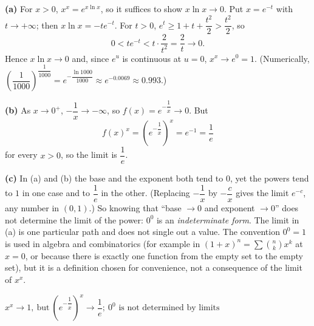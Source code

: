 \textbf{(a)} For $x>0$, $x^x=e^{x\ln x}$, so it suffices to show $x\ln x\to0$. Put $x=e^{-t}$ with $t\to+\infty$; then $x\ln x=-te^{-t}$. For $t>0$, $e^t\ge1+t+\dfrac{t^2}{2}>\dfrac{t^2}{2}$, so
\[0<te^{-t}<t\cdot\dfrac{2}{t^2}=\dfrac2t\to0.\]
Hence $x\ln x\to0$ and, since $e^u$ is continuous at $u=0$, $x^x\to e^0=1$. (Numerically, $\left(\dfrac{1}{1000}\right)^{\dfrac{1}{1000}}=e^{-\dfrac{\ln1000}{1000}}\approx e^{-0.0069}\approx0.993$.)

\textbf{(b)} As $x\to0^+$, $-\dfrac1x\to-\infty$, so $f(x)=e^{-\dfrac1x}\to0$. But
\[f(x)^x=\left(e^{-\dfrac1x}\right)^x=e^{-1}=\dfrac1e\]
for every $x>0$, so the limit is $\dfrac1e$.

\textbf{(c)} In (a) and (b) the base and the exponent both tend to $0$, yet the powers tend to $1$ in one case and to $\dfrac1e$ in the other. (Replacing $-\dfrac1x$ by $-\dfrac cx$ gives the limit $e^{-c}$, any number in $(0,1)$.) So knowing that ``base $\to0$ and exponent $\to0$'' does not determine the limit of the power: $0^0$ is an \emph{indeterminate form}. The limit in (a) is one particular path and does not single out a value. The convention $0^0=1$ is used in algebra and combinatorics (for example in $(1+x)^n=\sum\binom nkx^k$ at $x=0$, or because there is exactly one function from the empty set to the empty set), but it is a definition chosen for convenience, not a consequence of the limit of $x^x$.

$\boxed{x^x\to1,\ \text{but}\ \left(e^{-\dfrac1x}\right)^x\to\dfrac1e;\ 0^0\text{ is not determined by limits}}$
